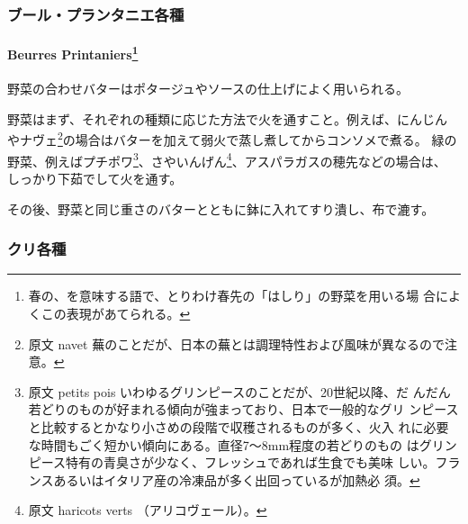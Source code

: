 \begin{recette}
\hypertarget{ux30d6ux30fcux30ebux30d7ux30e9ux30f3ux30bfux30cbux30a8ux5404ux7a2e}{%
\subsubsection{ブール・プランタニエ各種}\label{ux30d6ux30fcux30ebux30d7ux30e9ux30f3ux30bfux30cbux30a8ux5404ux7a2e}}

\hypertarget{beurres-printaniers}{%
\paragraph[Beurres Printaniers]{\texorpdfstring{Beurres
Printaniers\footnote{春の、を意味する語で、とりわけ春先の「はしり」の野菜を用いる場
  合によくこの表現があてられる。}}{Beurres Printaniers}}\label{beurres-printaniers}}


野菜の合わせバターはポタージュやソースの仕上げによく用いられる。

野菜はまず、それぞれの種類に応じた方法で火を通すこと。例えば、にんじん
やナヴェ\footnote{原文 navet
  蕪のことだが、日本の蕪とは調理特性および風味が異なるので注意。}の場合はバターを加えて弱火で蒸し煮してからコンソメで煮る。
緑の野菜、例えばプチポワ\footnote{原文 petits pois
  いわゆるグリンピースのことだが、20世紀以降、だ
  んだん若どりのものが好まれる傾向が強まっており、日本で一般的なグリ
  ンピースと比較するとかなり小さめの段階で収穫されるものが多く、火入
  れに必要な時間もごく短かい傾向にある。直径7〜8mm程度の若どりのもの
  はグリンピース特有の青臭さが少なく、フレッシュであれば生食でも美味
  しい。フランスあるいはイタリア産の冷凍品が多く出回っているが加熱必
  須。}、さやいんげん\footnote{原文 haricots verts （アリコヴェール）。}、アスパラガスの穂先などの場合は、
しっかり下茹でして火を通す。

その後、野菜と同じ重さのバターとともに鉢に入れてすり潰し、布で漉す。

\maeaki

\hypertarget{ux30afux30eaux5404ux7a2e}{%
\subsubsection{クリ各種}\label{ux30afux30eaux5404ux7a2e}}


\end{recette}
